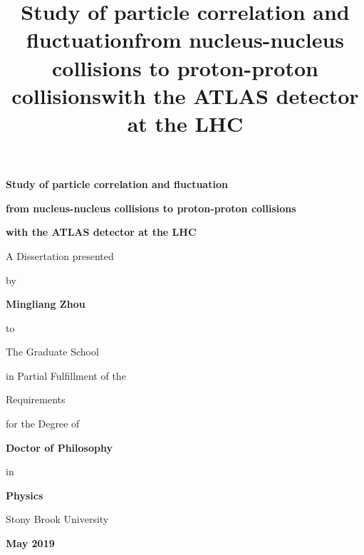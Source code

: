 \documentclass[12pt]{article}
\begin{document}
\title{\bf{Study of particle correlation and fluctuation}}
\title{\bf{from nucleus-nucleus collisions to proton-proton collisions}}
\title{\bf{with the ATLAS detector at the LHC}}

\vspace*{3\baselineskip}
\centerline{\bf{Study of particle correlation and fluctuation}}
\centerline{\bf{from nucleus-nucleus collisions to proton-proton collisions}}
\centerline{\bf{with the ATLAS detector at the LHC}}
\vspace*{1\baselineskip}
\centerline{A Dissertation presented}
\vspace*{1\baselineskip}
\centerline{by} 
\vspace*{1\baselineskip}
\centerline{\bf{Mingliang Zhou}}
\vspace*{1\baselineskip}
\centerline{to} 
\vspace*{1\baselineskip}
\centerline{The Graduate School}
\vspace*{1\baselineskip}
\centerline{in Partial Fulfillment of the}
\vspace*{1\baselineskip}
\centerline{Requirements}
\vspace*{1\baselineskip}
\centerline{for the Degree of}
\vspace*{1\baselineskip}
\centerline{\bf{Doctor of Philosophy}}
\vspace*{1\baselineskip}
\centerline{in}
\vspace*{1\baselineskip}
\centerline{\bf{Physics}}
\vspace*{2\baselineskip}
\centerline{Stony Brook University}
\vspace*{2\baselineskip}
\centerline{\bf{May 2019}}

\newpage
{}


\newpage
{}
\setcounter{page}{2}
\end{document}
